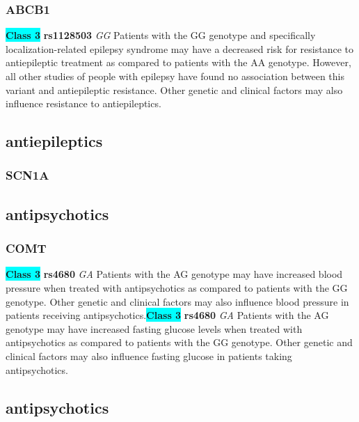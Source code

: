 \documentclass{book}
\begin{document}
\subsubsection{ ABCB1 }

\begin{center}
\textbf{\colorbox{cyan} {Class 3}} \textbf{ rs1128503 } \textit{ GG }
Patients with the GG genotype and specifically localization-related epilepsy syndrome may have a decreased risk for resistance to antiepileptic treatment as compared to patients with the AA genotype. However, all other studies of people with epilepsy have found no association between this variant and antiepileptic resistance. Other genetic and clinical factors may also influence resistance to antiepileptics. 


\end{center}\subsection{ antiepileptics }


\subsubsection{ SCN1A }

\begin{center}



\end{center}\subsection{ antipsychotics }


\subsubsection{ COMT }

\begin{center}
\textbf{\colorbox{cyan} {Class 3}} \textbf{ rs4680 } \textit{ GA }
Patients with the AG genotype may have increased blood pressure when treated with antipsychotics as compared to patients with the GG genotype. Other genetic and clinical factors may also influence blood pressure in patients receiving antipsychotics.\textbf{\colorbox{cyan} {Class 3}} \textbf{ rs4680 } \textit{ GA }
Patients with the AG genotype may have increased fasting glucose levels when treated with antipsychotics as compared to patients with the GG genotype. Other genetic and clinical factors may also influence fasting glucose in patients taking antipsychotics.


\end{center}\subsection{ antipsychotics }
\end{document}
